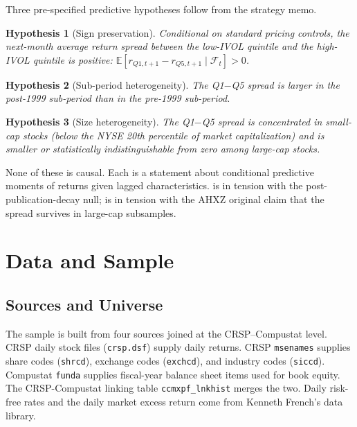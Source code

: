 \documentclass[12pt]{article}
\newtheorem{hyp}{Hypothesis}
\newcommand{\1}[1]{\mathds{1}\left[#1\right]}
\begin{document}
Three pre-specified predictive hypotheses follow from the strategy memo.

\begin{hyp}[Sign preservation]\label{hyp:h1}
Conditional on standard pricing controls, the next-month average return
spread between the low-IVOL quintile and the high-IVOL quintile is positive:
$\mathbb{E}[r_{Q1,t+1} - r_{Q5,t+1} \mid \mathcal{F}_t] > 0$.
\end{hyp}

\begin{hyp}[Sub-period heterogeneity]\label{hyp:h2}
The Q1$-$Q5 spread is \emph{larger} in the post-1999 sub-period than in the
pre-1999 sub-period.
\end{hyp}

\begin{hyp}[Size heterogeneity]\label{hyp:h3}
The Q1$-$Q5 spread is concentrated in small-cap stocks (below the NYSE 20th
percentile of market capitalization) and is smaller or statistically
indistinguishable from zero among large-cap stocks.
\end{hyp}

None of these is causal. Each is a statement about conditional predictive
moments of returns given lagged characteristics.  is in tension
with the \citet{mclean2016does} post-publication-decay null;  is
in tension with the AHXZ original claim that the spread survives in
large-cap subsamples.

\section{Data and Sample}\label{sec:data}

\subsection{Sources and Universe}

The sample is built from four sources joined at the CRSP--Compustat level.
CRSP daily stock files (\texttt{crsp.dsf}) supply daily returns. CRSP
\texttt{msenames} supplies share codes (\texttt{shrcd}), exchange codes
(\texttt{exchcd}), and industry codes (\texttt{siccd}). Compustat
\texttt{funda} supplies fiscal-year balance sheet items used for book equity.
The CRSP-Compustat linking table \texttt{ccmxpf\_lnkhist} merges the two.
Daily risk-free rates and the daily market excess return come from Kenneth
French's data library.
\end{document}
